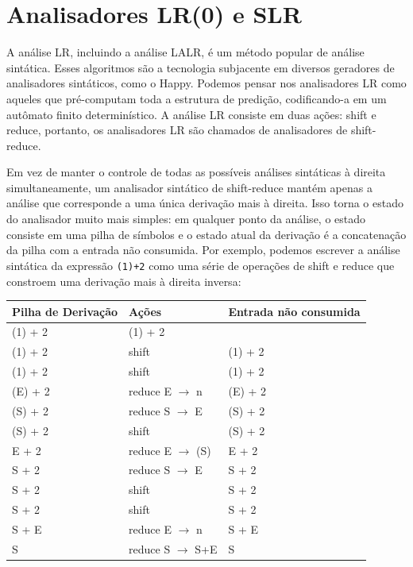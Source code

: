 \section{Analisadores LR(0) e SLR}

A análise LR, incluindo a análise LALR, é um método popular de
análise sintática. Esses algoritmos são a tecnologia subjacente em
diversos geradores de analisadores sintáticos, como o Happy. Podemos
pensar nos analisadores LR como aqueles que pré-computam toda a
estrutura de predição, codificando-a em um autômato finito determinístico.
A análise LR consiste em duas ações: shift e reduce, portanto, os
analisadores LR são chamados de analisadores de shift-reduce.

Em vez de manter o controle de todas as possíveis análises sintáticas
à direita simultaneamente, um analisador sintático de shift-reduce
mantém apenas a análise que corresponde a uma única derivação mais à
direita. Isso torna o estado do analisador muito mais simples: em
qualquer ponto da análise, o estado consiste em uma pilha de símbolos
e o estado atual da derivação é a concatenação da pilha com a entrada
não consumida. Por exemplo, podemos escrever a análise sintática da
expressão \verb|(1)+2| como uma série de operações de shift e reduce
que constroem uma derivação mais à direita inversa:

\begin{table}[H]
\begin{tabular}{@{}lll@{}}
  \toprule
  Pilha de Derivação & Ações & Entrada não consumida \\
  \midrule
  (1) + 2 & (1) + 2 & \\
  (1) + 2 & shift & (1) + 2 \\
  (1) + 2 & shift & (1) + 2 \\
  (E) + 2 & reduce E $\to$ n & (E) + 2 \\
  (S) + 2 & reduce S $\to$ E & (S) + 2 \\
  (S) + 2 & shift & (S) + 2 \\
  E + 2 & reduce E $\to$ (S) & E + 2 \\
  S + 2 & reduce S $\to$ E & S + 2 \\
  S + 2 & shift & S + 2 \\
  S + 2 & shift & S + 2 \\
  S + E & reduce E $\to$ n & S + E \\
  S & reduce S $\to$ S+E & S \\
  \bottomrule
\end{tabular}
\centering
\end{table}


